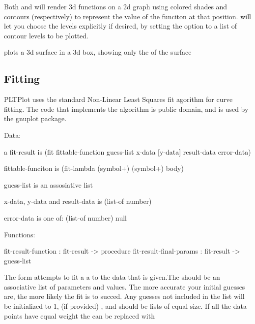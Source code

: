 \documentclass{article}
\begin{document}
{{{Both  and  will render 3d functions on a 2d graph using colored shades and contours (respectively) to represent the value of the funciton at that position.  will let you choose the levels explicitly if desired, by setting the  option to a list of contour levels to be plotted.

 plots a 3d surface in a 3d box, showing only the  of the surface

\subsection{Fitting}


PLTPlot uses the standard Non-Linear Least Squares fit agorithm for curve fitting. The code that implements the algorithm is public domain, and is used by the gnuplot package.



\begin{schemedisplay}

Data:
       
a fit-result is 
  (fit fittable-function guess-list x-data [y-data] result-data error-data)       
  
fittable-funciton is
  (fit-lambda (symbol+) (symbol+) body)
  
guess-list is an assosiative list
  
x-data, y-data and result-data is
  (list-of number)
  
error-data is one of:
  (list-of number)
  null
  
Functions:
  
  fit-result-function : fit-result -> procedure
  fit-result-final-params : fit-result -> guess-list
      
       
\end{schemedisplay}



The  form attempts to fit a a  to the data that is given.The should be an associative list of parameters and values. The more accurate  your initial guesses are, the more likely the fit is to succed. Any guesses not included in the list will be initialized to 1,  (if provided) ,  and  should be lists of equal size. If all the data points have equal weight
       the  can be replaced with 


}}}
\end{document}

